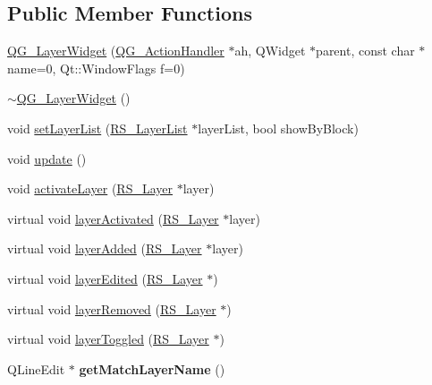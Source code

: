\subsection*{Public Member Functions}
\begin{DoxyCompactItemize}
\item 
\hyperlink{classQG__LayerWidget_ab0e3c1d039e10b85123809eeb8992af4}{Q\-G\-\_\-\-Layer\-Widget} (\hyperlink{classQG__ActionHandler}{Q\-G\-\_\-\-Action\-Handler} $\ast$ah, Q\-Widget $\ast$parent, const char $\ast$name=0, Qt\-::\-Window\-Flags f=0)
\item 
\hyperlink{classQG__LayerWidget_a18835f5398a488765db5f1d1c5e35b21}{$\sim$\-Q\-G\-\_\-\-Layer\-Widget} ()
\item 
void \hyperlink{classQG__LayerWidget_a9748eb839c74ebc7754f949a69d56196}{set\-Layer\-List} (\hyperlink{classRS__LayerList}{R\-S\-\_\-\-Layer\-List} $\ast$layer\-List, bool show\-By\-Block)
\item 
void \hyperlink{classQG__LayerWidget_a03ed2304a473131bf9b752e426860796}{update} ()
\item 
void \hyperlink{classQG__LayerWidget_af55da8ed292b21e44f72e0a59101eac4}{activate\-Layer} (\hyperlink{classRS__Layer}{R\-S\-\_\-\-Layer} $\ast$layer)
\item 
virtual void \hyperlink{classQG__LayerWidget_af67ac3c98b8f8dba926345677ce90f62}{layer\-Activated} (\hyperlink{classRS__Layer}{R\-S\-\_\-\-Layer} $\ast$layer)
\item 
virtual void \hyperlink{classQG__LayerWidget_afd491d7e1792632c1dab71329c258f96}{layer\-Added} (\hyperlink{classRS__Layer}{R\-S\-\_\-\-Layer} $\ast$layer)
\item 
virtual void \hyperlink{classQG__LayerWidget_a4de9c38c5374cd79855e69b1bb1929d4}{layer\-Edited} (\hyperlink{classRS__Layer}{R\-S\-\_\-\-Layer} $\ast$)
\item 
virtual void \hyperlink{classQG__LayerWidget_ac11105df931565da55e7299121823706}{layer\-Removed} (\hyperlink{classRS__Layer}{R\-S\-\_\-\-Layer} $\ast$)
\item 
virtual void \hyperlink{classQG__LayerWidget_a4b5b55580590c971dffff3b9707b6b23}{layer\-Toggled} (\hyperlink{classRS__Layer}{R\-S\-\_\-\-Layer} $\ast$)
\item 
\hypertarget{classQG__LayerWidget_a7389544e7de72aba94022599af6ef94d}{Q\-Line\-Edit $\ast$ {\bfseries get\-Match\-Layer\-Name} ()}\label{classQG__LayerWidget_a7389544e7de72aba94022599af6ef94d}

\end{DoxyCompactItemize}
